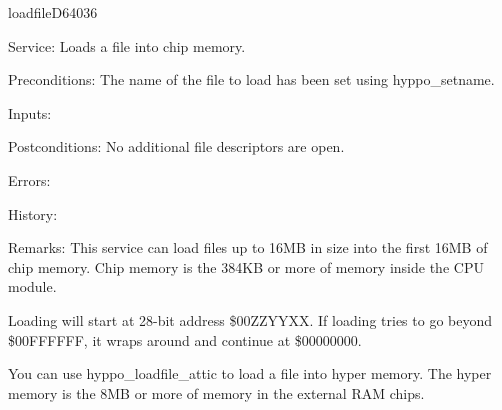 \newpage
\begin{hyppotrap}{loadfile}{D640}{36}
\item [Service:]
  Loads a file into chip memory.
\item [Preconditions:]
  The name of the file to load has been set using hyppo\_setname.
\item [Inputs:]
\item [Postconditions:]
  No additional file descriptors are open.
\item [Errors:]
\item [History:]
\item [Remarks:]
  This service can load files up to 16MB in size into the first 16MB of chip
  memory. Chip memory is the 384KB or more of memory inside the CPU module.

  Loading will start at 28-bit address \$00ZZYYXX. If loading tries to go beyond
  \$00FFFFFF, it wraps around and continue at \$00000000.

  You can use hyppo\_loadfile\_attic to load a file into hyper memory. The hyper
  memory is the 8MB or more of memory in the external RAM chips.
\end{hyppotrap}



